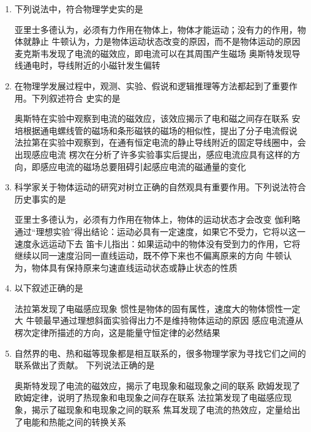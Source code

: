 \begin{enumerate}
\item 
{}
下列说法中，符合物理学史实的是  


\fourchoices
{亚里士多德认为，必须有力作用在物体上，物体才能运动；没有力的作用，物体就静止}
{牛顿认为，力是物体运动状态改变的原因，而不是物体运动的原因}
{麦克斯韦发现了电流的磁效应，即电流可以在其周围产生磁场}
{奥斯特发现导线通电时，导线附近的小磁针发生偏转}


\item 
{}
在物理学发展过程中，观测、实验、假说和逻辑推理等方法都起到了重要作用。下列叙述符合
史实的是  

\fourchoices
{奥斯特在实验中观察到电流的磁效应，该效应揭示了电和磁之间存在联系}
{安培根据通电螺线管的磁场和条形磁铁的磁场的相似性，提出了分子电流假说}
{法拉第在实验中观察到，在通有恒定电流的静止导线附近的固定导线圈中，会出现感应电流}
{楞次在分析了许多实验事实后提出，感应电流应具有这样的方向，即感应电流的磁场总要阻碍引起感应电流的磁通量的变化}



\item 
{}
科学家关于物体运动的研究对树立正确的自然观具有重要作用。下列说法符合历史事实的是  

\fourchoices
{亚里士多德认为，必须有力作用在物体上，物体的运动状态才会改变}
{伽利略通过“理想实验”得出结论：运动必具有一定速度，如果它不受力，它将以这一速度永远运动下去}
{笛卡儿指出：如果运动中的物体没有受到力的作用，它将继续以同一速度沿同一直线运动，既不停下来也不偏离原来的方向}
{牛顿认为，物体具有保持原来匀速直线运动状态或静止状态的性质}



\item 
{}
以下叙述正确的是  


\fourchoices
{法拉第发现了电磁感应现象}
{惯性是物体的固有属性，速度大的物体惯性一定大}
{牛顿最早通过理想斜面实验得出力不是维持物体运动的原因}
{感应电流遵从楞次定律所描述的方向，这是能量守恒定律的必然结果}


\item
{}
自然界的电、热和磁等现象都是相互联系的，很多物理学家为寻找它们之间的联系做出了贡献。
下列说法正确的是  


\fourchoices
{奥斯特发现了电流的磁效应，揭示了电现象和磁现象之间的联系}
{欧姆发现了欧姆定律，说明了热现象和电现象之间存在联系}
{法拉第发现了电磁感应现象，揭示了磁现象和电现象之间的联系}
{焦耳发现了电流的热效应，定量给出了电能和热能之间的转换关系}



\end{enumerate}
